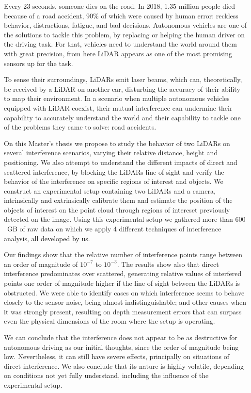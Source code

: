 Every 23 seconds, someone dies on the road. In 2018, 1.35 million people died because of a road accident, 90\% of which were caused by human error: reckless behavior, distractions, fatigue, and bad decisions. Autonomous vehicles are one of the solutions to tackle this problem, by replacing or helping the human driver on the driving task. For that, vehicles need to understand the world around them with great precision, from here LiDAR appears as one of the most promising sensors up for the task. 

To sense their surroundings, LiDARs emit laser beams, which can, theoretically, be received by a LiDAR on another car, disturbing the accuracy of their ability to map their environment. In a scenario when multiple autonomous vehicles equipped with LiDAR coexist, their mutual interference can undermine their capability to accurately understand the world and their capability to tackle one of the problems they came to solve: road accidents. 

On this Master's thesis we propose to study the behavior of two LiDARs on several interference scenarios, varying their relative distance, height and positioning. We also attempt to understand the different impacts of direct and scattered interference, by blocking the LiDARs line of sight and verify the behavior of the interference on specific regions of interest and objects. We construct an experimental setup containing two LiDARs and a camera, intrinsically and extrinsically calibrate them and estimate the position of the objects of interest on the point cloud through regions of intereset previously detected on the image. Using this experimental setup we gathered more than $600$~GB of raw data on which we apply 4 different techniques of interference analysis, all developed by us.

Our findings show that the relative number of interference points range between an order of magnitude of $10^{-7}$ to $10^{-3}$. The results show also that direct interference predominates over scattered, generating relative values of interfered points one order of magnitude higher if the line of sight between the LiDARs is obstructed. We were able to identify cases on which interference seems to behave closely to the sensor noise, being almost indistinguishable; and other causes when it was strongly present, resulting on depth measurement errors that can surpass even the physical dimensions of the room where the setup is operating. 

We can conclude that the interference does not appear to be as destructive for autonomous driving as our initial thoughts, since the order of magnitude being low. Nevertheless, it can still have severe effects, principally on situations of direct interference. We also conclude that its nature is highly volatile, depending on conditions not yet fully understand, including the influence of the experimental setup.

